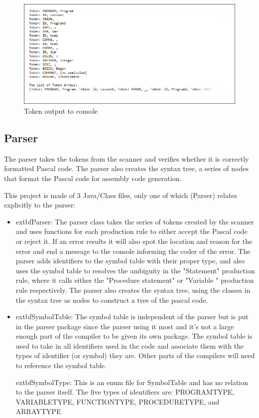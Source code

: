 \documentclass[english]{article}
\begin{document}
\begin{figure}
\begin{center}
\includegraphics[width=1.1   extwidth]{output.PNG}
\end{center}
\caption{\label{Output}Token output to console}
\end{figure}


\subsection{Parser}

The parser takes the tokens from the scanner and verifies whether it is correctly formatted Pascal code. The parser also creates the syntax tree, a series of nodes that format the Pascal code for assembly code generation.

This project is made of 3 Java/Class files, only one of which (Parser) relates explicitly to the parser:

\begin{itemize}

\item
   extbf{Parser}: The parser class takes the series of tokens created by the scanner and uses functions for each production rule to either accept the Pascal code or reject it. If an error results it will also spot the location and reason for the error and end a message to the console informing the coder of the error. The parser adds identifiers to the symbol table with their proper type, and also uses the symbol table to resolves the ambiguity in the "Statement" production rule, where it calls either the "Procedure statement" or "Variable " production rule respectively. The parser also creates the syntax tree, using the classes in the syntax tree as nodes to construct a tree of the pascal code.

\item
   extbf{SymbolTable}: The symbol table is independent of the parser but is put in the parser package since the parser using it most and it’s not a large enough part of the compiler to be given its own package. The symbol table is used to take in all identifiers used in the code and associate them with the types of identifier (or symbol) they are. Other parts of the compilers will need to reference the symbol table.

   extbf{SymbolType}: This is an enum file for SymbolTable and has no relation to the parser itself. The five types of identifiers are: PROGRAMTYPE, VARIABLETYPE, FUNCTIONTYPE, PROCEDURETYPE, and ARRAYTYPE

\end{itemize}
\end{document}

